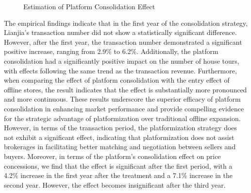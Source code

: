 \documentclass[11pt]{article}
\begin{document}
\begin{figure}[ht]
    \caption{Estimation of Platform Consolidation Effect}
    \label{fig:dynamic_effect}
\end{figure}

The empirical findings indicate that in the first year of the consolidation strategy, Lianjia's transaction number did not show a statistically significant difference. However, after the first year, the transaction number demonstrated a significant positive increase, ranging from 2.9\% to 6.2\%. Additionally, the platform consolidation had a significantly positive impact on the number of house tours, with effects following the same trend as the transaction revenue. Furthermore, when comparing the effect of platform consolidation with the entry effect of offline stores, the result indicates that the effect is substantially more pronounced and more continuous. These results underscore the superior efficacy of platform consolidation in enhancing market performance and provide compelling evidence for the strategic advantage of platformization over traditional offline expansion. However, in terms of the transaction period, the platformization strategy does not exhibit a significant effect, indicating that platformization does not assist brokerages in facilitating better matching and negotiation between sellers and buyers. Moreover, in terms of the platform's consolidation effect on price concessions, we find that the effect is significant after the first period, with a 4.2\% increase in the first year after the treatment and a 7.1\% increase in the second year. However, the effect becomes insignificant after the third year. 
\end{document}
